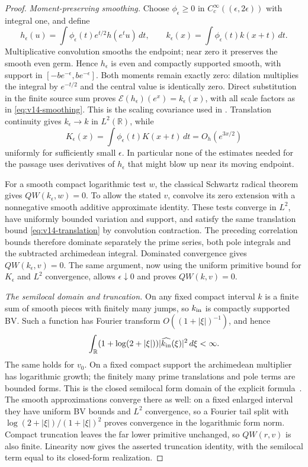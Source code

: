 \documentclass[11pt]{article}
\theoremstyle{remark}
\begin{document}
\begin{proof}
\emph{Moment-preserving smoothing.}
Choose $\phi_\epsilon\ge0$ in $C_c^\infty((\epsilon,2\epsilon))$
with integral one, and define
\begin{equation}\label{eq:v14-smoothing}
 h_\epsilon(u)=\int\phi_\epsilon(t)e^{t/2}h(e^t u)\,dt,
 \qquad
 k_\epsilon(x)=\int\phi_\epsilon(t)k(x+t)\,dt.
\end{equation}
Multiplicative convolution smooths the endpoint; near zero it preserves
the smooth even germ. Hence $h_\epsilon$ is even and compactly supported
smooth, with support in $[-be^{-\epsilon},be^{-\epsilon}]$.
Both moments remain exactly zero: dilation multiplies the integral by
$e^{-t/2}$ and the central value is identically zero. Direct substitution
in the finite source sum proves
$\mathcal E(h_\epsilon)(e^x)=k_\epsilon(x)$, with all scale factors
as in \eqref{eq:v14-smoothing}. This is the scaling covariance used in
\cite[Lemma 6.2]{ConnesConsani2023}. Translation continuity gives
$k_\epsilon\to k$ in $L^2(\mathbb R)$, while
\[
 K_\epsilon(x)=\int\phi_\epsilon(t)K(x+t)\,dt
              =O_h(e^{3x/2})
\]
uniformly for sufficiently small $\epsilon$. In particular none of the
estimates needed for the passage uses derivatives of $h_\epsilon$ that
might blow up near its moving endpoint.

For a smooth compact logarithmic test $w$, the classical Schwartz
radical theorem gives $QW(k_\epsilon,w)=0$. To allow the stated $v$,
convolve its zero extension with a nonnegative smooth additive
approximate identity. These tests converge in $L^2$, have uniformly
bounded variation and support, and satisfy the same translation bound
\eqref{eq:v14-translation} by convolution contraction. The preceding
correlation bounds therefore dominate separately the prime series, both
pole integrals and the subtracted archimedean integral. Dominated
convergence gives $QW(k_\epsilon,v)=0$. The same argument, now using
the uniform primitive bound for $K_\epsilon$ and $L^2$ convergence,
allows $\epsilon\downarrow0$ and proves $QW(k,v)=0$.

\emph{The semilocal domain and truncation.}
On any fixed compact interval $k$ is a finite sum of smooth pieces with
finitely many jumps, so $k_{\rm in}$ is compactly supported BV. Such a
function has Fourier transform $O((1+|\xi|)^{-1})$, and hence
\[
 \int_{\mathbb R}(1+\log(2+|\xi|))
               |\widehat{k_{\rm in}}(\xi)|^2\,d\xi<\infty.
\]
The same holds for $v_0$. On a fixed compact support the archimedean
multiplier has logarithmic growth; the finitely many prime translations
and pole terms are bounded forms. This is the closed semilocal form
domain of the explicit formula~\cite{ConnesConsani2023}.
The smooth approximations converge there as well: on a fixed enlarged
interval they have uniform BV bounds and $L^2$ convergence, so a Fourier
tail split with $\log(2+|\xi|)/(1+|\xi|)^2$ proves convergence in the
logarithmic form norm. Compact truncation leaves the far lower primitive
unchanged, so $QW(r,v)$ is also finite. Linearity now gives the asserted
truncation identity, with the semilocal term equal to its closed-form
realization.
\end{proof}
\end{document}
